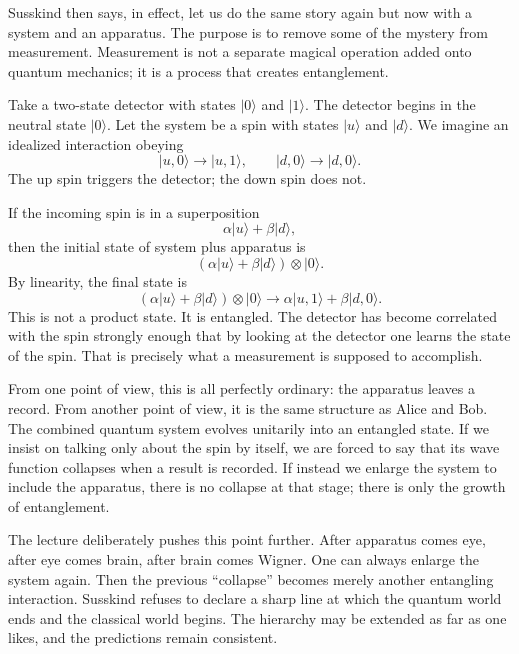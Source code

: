 Susskind then says, in effect, let us do the same story again but now with a system and an apparatus. The purpose is to remove some of the mystery from measurement. Measurement is not a separate magical operation added onto quantum mechanics; it is a process that creates entanglement.

Take a two-state detector with states $|0\rangle$ and $|1\rangle$. The detector begins in the neutral state $|0\rangle$. Let the system be a spin with states $|u\rangle$ and $|d\rangle$. We imagine an idealized interaction obeying
\begin{equation}
|u,0\rangle \longrightarrow |u,1\rangle,
\qquad
|d,0\rangle \longrightarrow |d,0\rangle.
\end{equation}
The up spin triggers the detector; the down spin does not.

If the incoming spin is in a superposition
\[
\alpha |u\rangle+\beta |d\rangle,
\]
then the initial state of system plus apparatus is
\begin{equation}
(\alpha |u\rangle+\beta |d\rangle)\otimes |0\rangle.
\end{equation}
By linearity, the final state is
\begin{equation}
(\alpha |u\rangle+\beta |d\rangle)\otimes |0\rangle
\longrightarrow
\alpha |u,1\rangle+\beta |d,0\rangle.
\end{equation}
This is not a product state. It is entangled. The detector has become correlated with the spin strongly enough that by looking at the detector one learns the state of the spin. That is precisely what a measurement is supposed to accomplish.

From one point of view, this is all perfectly ordinary: the apparatus leaves a record. From another point of view, it is the same structure as Alice and Bob. The combined quantum system evolves unitarily into an entangled state. If we insist on talking only about the spin by itself, we are forced to say that its wave function collapses when a result is recorded. If instead we enlarge the system to include the apparatus, there is no collapse at that stage; there is only the growth of entanglement.

The lecture deliberately pushes this point further. After apparatus comes eye, after eye comes brain, after brain comes Wigner. One can always enlarge the system again. Then the previous ``collapse'' becomes merely another entangling interaction. Susskind refuses to declare a sharp line at which the quantum world ends and the classical world begins. The hierarchy may be extended as far as one likes, and the predictions remain consistent.

